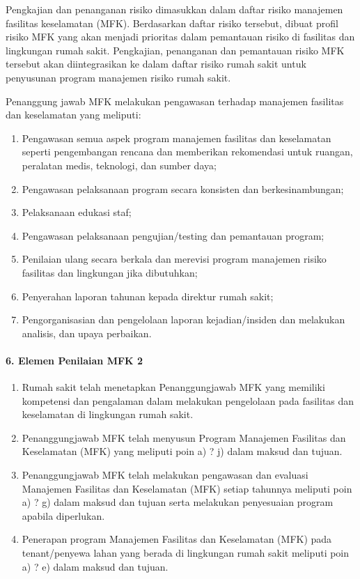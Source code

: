 \documentclass[
]{book}
\providecommand{\tightlist}{%
  \setlength{\itemsep}{0pt}\setlength{\parskip}{0pt}}
\begin{document}
Pengkajian dan penanganan risiko dimasukkan dalam daftar risiko manajemen fasilitas keselamatan (MFK). Berdasarkan daftar risiko tersebut, dibuat profil risiko MFK yang akan menjadi prioritas dalam pemantauan risiko di fasilitas dan lingkungan rumah sakit. Pengkajian, penanganan dan pemantauan risiko MFK tersebut akan diintegrasikan ke dalam daftar risiko rumah sakit untuk penyusunan program manajemen risiko rumah sakit.

Penanggung jawab MFK melakukan pengawasan terhadap manajemen fasilitas dan keselamatan yang meliputi:

\begin{enumerate}
\def\labelenumi{\alph{enumi}.}
\tightlist
\item
  Pengawasan semua aspek program manajemen fasilitas dan keselamatan seperti pengembangan rencana dan memberikan rekomendasi untuk ruangan, peralatan medis, teknologi, dan sumber daya;
\item
  Pengawasan pelaksanaan program secara konsisten dan berkesinambungan;
\item
  Pelaksanaan edukasi staf;
\item
  Pengawasan pelaksanaan pengujian/testing dan pemantauan program;
\item
  Penilaian ulang secara berkala dan merevisi program manajemen risiko fasilitas dan lingkungan jika dibutuhkan;
\item
  Penyerahan laporan tahunan kepada direktur rumah sakit;
\item
  Pengorganisasian dan pengelolaan laporan kejadian/insiden dan melakukan analisis, dan upaya perbaikan.
\end{enumerate}

\hypertarget{elemen-penilaian-mfk-2}{%
\paragraph*{6. Elemen Penilaian MFK 2}\label{elemen-penilaian-mfk-2}}

\begin{enumerate}
\def\labelenumi{\alph{enumi}.}
\tightlist
\item
  Rumah sakit telah menetapkan Penanggungjawab MFK yang memiliki kompetensi dan pengalaman dalam melakukan pengelolaan pada fasilitas dan keselamatan di lingkungan rumah sakit.
\item
  Penanggungjawab MFK telah menyusun Program Manajemen Fasilitas dan Keselamatan (MFK) yang meliputi poin a) ? j) dalam maksud dan tujuan.
\item
  Penanggungjawab MFK telah melakukan pengawasan dan evaluasi Manajemen Fasilitas dan Keselamatan (MFK) setiap tahunnya meliputi poin a) ? g) dalam maksud dan tujuan serta melakukan penyesuaian program apabila diperlukan.
\item
  Penerapan program Manajemen Fasilitas dan Keselamatan (MFK) pada tenant/penyewa lahan yang berada di lingkungan rumah sakit meliputi poin a) ? e) dalam maksud dan tujuan.
\end{enumerate}
\end{document}
